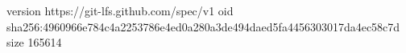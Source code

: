 version https://git-lfs.github.com/spec/v1
oid sha256:4960966e784c4a2253786e4ed0a280a3de494daed5fa4456303017da4ec58c7d
size 165614
